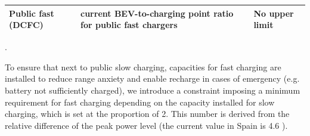 \begin{table}[H]
{\begin{tabular}{lll}
            Public fast (DCFC)                            & current \ac{BEV}-to-charging point ratio for public fast chargers \citep{eafo2024ev, eurostatZEV}                                  & No upper limit                                                                                                                                                                                                                                                               \\ \hline
            \end{tabular}%
            }
            \end{table}

            .  

            To ensure that next to public slow charging, capacities for fast charging are installed to reduce range anxiety and enable recharge in cases of emergency (e.g. battery not sufficiently charged), we introduce a constraint imposing a minimum requirement for fast charging depending on the capacity installed for slow charging, which is set at the proportion of 2. This number is derived from the relative difference of the peak power level (the current value in Spain is 4.6 \citep{eafo2024ev}).
    
